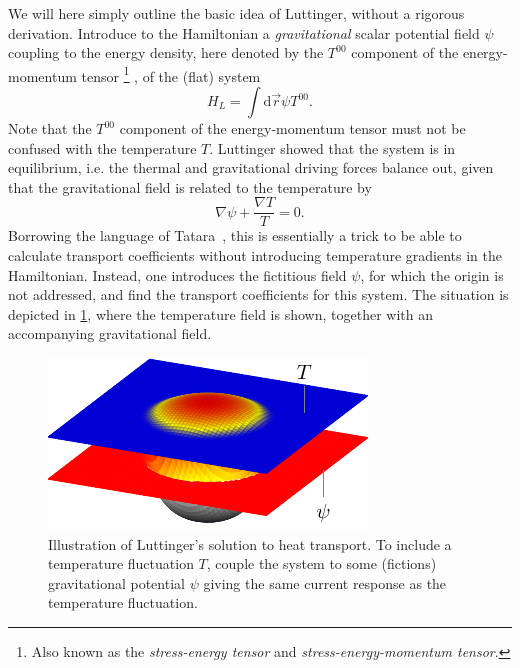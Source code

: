 We will here simply outline the basic idea of Luttinger, without a rigorous derivation.
Introduce to the Hamiltonian a \emph{gravitational} scalar potential field $\psi$ coupling to the energy density, here denoted by the $T^{00}$ component of the energy-momentum tensor%
\footnote{Also known as the \emph{stress-energy tensor} and \emph{stress-energy-momentum tensor}.}%
, of the (flat) system~\cite{luttingerTheoryThermalTransport1964}
\begin{equation}
  \label{eq:luttinger-term}
  H_L = \int \mathrm{d}\vec{r} \psi T^{00}.
\end{equation}
Note that the $T^{00}$ component of the energy-momentum tensor must not be confused with the temperature $T$.
Luttinger showed that the system is in equilibrium, i.e. the thermal and gravitational driving forces balance out, given that the gravitational field is related to the temperature by
\begin{equation}
  \label{eq:balance}
  \nabla\psi + \frac{\nabla T}{T} = 0.
\end{equation}
Borrowing the language of Tatara~\cite{tataraThermalVectorPotential2015}, this is essentially a trick to be able to calculate transport coefficients without introducing temperature gradients in the Hamiltonian.
Instead, one introduces the fictitious field $\psi$, for which the origin is not addressed, and find the transport coefficients for this system.
The situation is depicted in \cref{fig:luttinger-idea}, where the temperature field is shown, together with an accompanying gravitational field.
\begin{figure}[h]
  \centering
  \includegraphics{figures/LinearResponse_bump}
  \caption{Illustration of Luttinger's solution to heat transport. To include a temperature fluctuation $T$, couple the system to some (fictions) gravitational potential $\psi$ giving the same current response as the temperature fluctuation.}
  \label{fig:luttinger-idea}
\end{figure}

